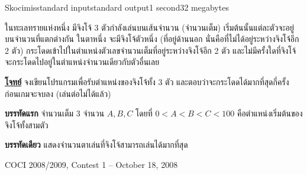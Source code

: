 \documentclass[11pt,a4paper]{article}
\begin{document}
\begin{problem}{Skocimis}{standard input}{standard output}{1 second}{32 megabytes}

ในทะเลทรายแห่งหนึ่ง มีจิงโจ้ 3 ตัวกำลังเล่นบนเส้นจำนวน (จำนวนเต็ม) เริ่มต้นนั้นแต่ละตัวจะอยู่บนจำนวนที่แตกต่างกัน ในตาหนึ่ง จะมีจิงโจ้ตัวหนึ่ง (ที่อยู่ด้านนอก นั่นคือที่ไม่ได้อยู่ระหว่างจิงโจ้อีก 2 ตัว) กระโดดเข้าไปในตำแหน่งตัวเลขจำนวนเต็มที่อยู่ระหว่างจิงโจ้อีก 2 ตัว และไม่มีครั้งใดที่จิงโจ้จะกระโดดไปอยู่ในตำแหน่งจำนวนเดียวกับตัวอื่นเลย

\underline{\textbf{โจทย์}} จงเขียนโปรแกรมเพื่อรับตำแหน่งของจิงโจ้ทั้ง 3 ตัว และตอบว่าจะกระโดดได้มากที่สุดกี่ครั้ง ก่อนเกมจะจบลง (เล่นต่อไม่ได้แล้ว)

\InputFile

\textbf{บรรทัดแรก} จำนวนเต็ม 3 จำนวน $A, B, C$ โดยที่ $0 < A < B < C < 100$ คือตำแหน่งเริ่มต้นของจิงโจ้ทั้งสามตัว

\OutputFile

\textbf{บรรทัดเดียว} แสดงจำนวนตาเล่นที่จิงโจ้สามารถเล่นได้มากที่สุด

\Source

COCI 2008/2009, Contest 1 – October 18, 2008

\Examples

\begin{example}
%
%
\end{example}

\end{problem}
\end{document}
